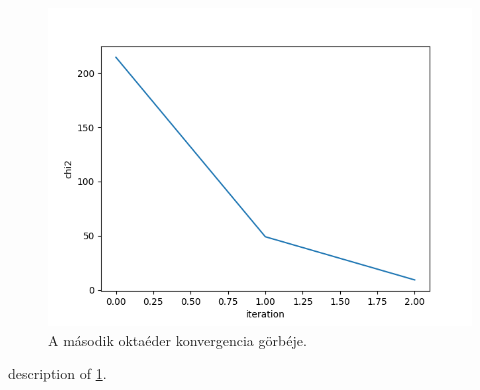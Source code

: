 \begin{figure}[h!]
	\centering
	\includegraphics[scale=0.7]{images/octahedron_02.png}
	\caption{A második oktaéder konvergencia görbéje.}
	\label{fig:octa02}
\end{figure}

description of \ref{fig:octa02}.